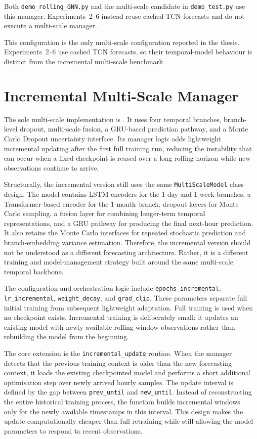 \documentclass[12pt,a4paper]{report}
\begin{document}
	Both \texttt{demo\_rolling\_GNN.py} and the multi-scale candidate in \texttt{demo\_test.py} use this manager. Experiments~2--6 instead reuse cached TCN forecasts and do not execute a multi-scale manager.
	
	This configuration is the only multi-scale configuration reported in the thesis. Experiments~2--6 use cached TCN forecasts, so their temporal-model behaviour is distinct from the incremental multi-scale benchmark.
	
	
	\section{Incremental Multi-Scale Manager}
	
	The sole multi-scale implementation is . It uses four temporal branches, branch-level dropout, multi-scale fusion, a GRU-based prediction pathway, and a Monte Carlo Dropout uncertainty interface. Its manager logic adds lightweight incremental updating after the first full training run, reducing the instability that can occur when a fixed checkpoint is reused over a long rolling horizon while new observations continue to arrive.
	
	Structurally, the incremental version still uses the same \texttt{MultiScaleModel} class design. The model contains LSTM encoders for the 1-day and 1-week branches, a Transformer-based encoder for the 1-month branch, dropout layers for Monte Carlo sampling, a fusion layer for combining longer-term temporal representations, and a GRU pathway for producing the final next-hour prediction. It also retains the Monte Carlo interfaces for repeated stochastic prediction and branch-embedding variance estimation. Therefore, the incremental version should not be understood as a different forecasting architecture. Rather, it is a different training and model-management strategy built around the same multi-scale temporal backbone.
	
	The configuration and orchestration logic include \texttt{epochs\_incremental}, \texttt{lr\_incremental}, \texttt{weight\_decay}, and \texttt{grad\_clip}. These parameters separate full initial training from subsequent lightweight adaptation. Full training is used when no checkpoint exists. Incremental training is deliberately small: it updates an existing model with newly available rolling-window observations rather than rebuilding the model from the beginning.
	
	The core extension is the \texttt{incremental\_update} routine. When the manager detects that the previous training context is older than the new forecasting context, it loads the existing checkpointed model and performs a short additional optimisation step over newly arrived hourly samples. The update interval is defined by the gap between \texttt{prev\_until} and \texttt{new\_until}. Instead of reconstructing the entire historical training process, the function builds incremental windows only for the newly available timestamps in this interval. This design makes the update computationally cheaper than full retraining while still allowing the model parameters to respond to recent observations.
	
\end{document}
